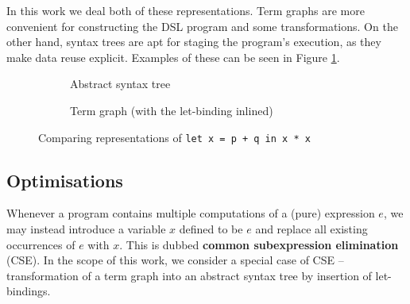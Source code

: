 In this work we deal both of these representations. Term graphs are more convenient for constructing the DSL program and some transformations. On the other hand, syntax trees are apt for staging the program's execution, as they make data reuse explicit. Examples of these can be seen in Figure \ref{fig:term-repr}.

\begin{figure}[ht]
\centering
\begin{subfigure}{.4\textwidth}
  \centering
{}
  \caption{Abstract syntax tree}
\end{subfigure}%
\begin{subfigure}{.4\textwidth}
  \centering
{}
  \caption{Term graph (with the let-binding inlined)}
\end{subfigure}
\caption{Comparing representations of \texttt{let x = p + q in x * x}}
\label{fig:term-repr}
\end{figure}


\subsection{Optimisations} \label{general-optimisations}

Whenever a program contains multiple computations of a (pure) expression $e$, we may instead introduce a variable $x$ defined to be $e$ and replace all existing occurrences of $e$ with $x$. This is dubbed \textbf{common subexpression elimination} (CSE).
In the scope of this work, we consider a special case of CSE -- transformation of a term graph into an abstract syntax tree by insertion of let-bindings.

